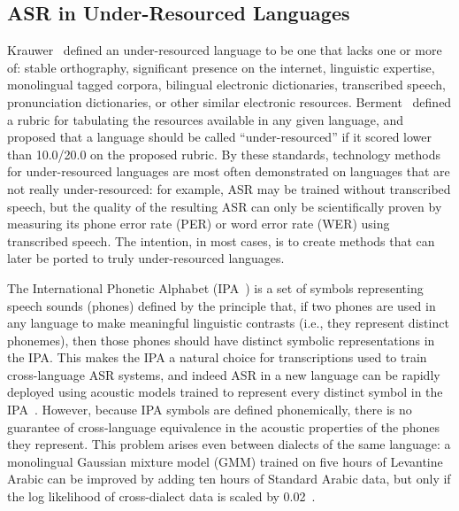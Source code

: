\subsection{ASR in Under-Resourced Languages}

Krauwer~\cite{Krauwer2003} defined an under-resourced language to be
one that lacks one or more of: stable orthography, significant
presence on the internet, linguistic expertise, monolingual tagged
corpora, bilingual electronic dictionaries, transcribed speech,
pronunciation dictionaries, or other similar electronic resources.
Berment~\cite{Berment2004} defined a rubric for tabulating the
resources available in any given language, and proposed that a
language should be called ``under-resourced'' if it scored lower than
10.0/20.0 on the proposed rubric.  By these standards, technology
methods for under-resourced languages are most often demonstrated on
languages that are not really under-resourced: for example, ASR may be
trained without transcribed speech, but the quality of the resulting
ASR can only be scientifically proven by measuring its phone error
rate (PER) or word error rate (WER) using transcribed speech.  The
intention, in most cases, is to create methods that can later be
ported to truly under-resourced languages.

The International Phonetic Alphabet (IPA~\cite{ipa1993}) is a set of
symbols representing speech sounds (phones) defined by the principle
that, if two phones are used in any language to make meaningful
linguistic contrasts (i.e., they represent distinct phonemes), then
those phones should have distinct symbolic representations in the IPA.
This makes the IPA a natural choice for transcriptions used to train
cross-language ASR systems, and indeed ASR in a new language can be 
rapidly deployed using acoustic models trained to represent every 
distinct symbol in the IPA~\cite{Schultz2001}.
However, because IPA symbols are defined phonemically, there is no
guarantee of cross-language equivalence in the acoustic properties of
the phones they represent. This problem arises even between dialects of
the same language: a monolingual Gaussian mixture model (GMM) trained on
five hours of Levantine Arabic can be improved by adding ten hours of
Standard Arabic data, but only if the log likelihood of cross-dialect
data is scaled by 0.02~\cite{Huang2012}.

